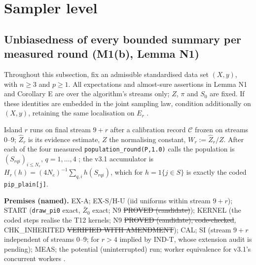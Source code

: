 \section{Sampler level}\label{sec:sampler}

\subsection{Unbiasedness of every bounded summary per measured round (M1(b), Lemma N1)}
Throughout this subsection, fix an admissible standardised data set $(X,y)$, with $n\ge3$ and $p\ge1$. All expectations and almost-sure assertions in Lemma N1 and Corollary E are over the algorithm's streams only; $Z$, $\pi$ and $S_0$ are fixed. If these identities are embedded in the joint sampling law, condition additionally on $(X,y)$, retaining the same localisation on $E_r$ .\par Island $r$ runs on final stream $9+r$ after a calibration record $\mathcal C$ frozen on streams 0--9; $\hat{Z}_r$ is its evidence estimate, $Z$ the normalising constant, $W_r:=\hat{Z}_r/Z$. After each of the four measured \texttt{population\_round(P,1.0)} calls the population is $(S_{rqi})_{i\le N_e}$, $q=1,\dots,4$ ; the v3.1 accumulator is $H_r(h)=(4N_e)^{-1}\sum_{q,i}h(S_{rqi})$, which for $h=1\{j\in S\}$ is exactly the coded \texttt{pip\_plain[j]}.

\textbf{Premises (named).} EX-A; EX-S/H-U (iid uniforms within stream $9+r$); START (\texttt{draw\_pi0} exact, $\bar{Z}_0$ exact; N9 \st{PROVED (candidate)}); KERNEL (the coded steps realise the T12 kernels; N9 \st{PROVED (candidate), code-checked}, CHK\_INHERITED \st{VERIFIED WITH AMENDMENT}); CAL; SI (stream $9+r$ independent of streams 0--9; for $r>4$ implied by IND-T, whose extension audit is pending); MEAS; the potential (uninterrupted) run; worker equivalence for v3.1's concurrent workers .

